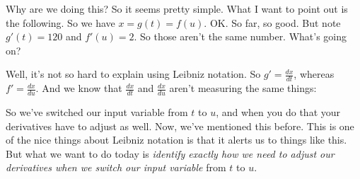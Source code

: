 \documentclass[pdftex, brazil, 12pt, twoside]{article}
\begin{document}
Why are we doing this?
So it seems pretty simple.
What I want to point out is the following.
So we have $x=g(t)=f(u)$. OK.
So far, so good.
But note $g'(t) = 120$ and $f'(u)=2$.
So those aren't the same number.
What's going on?

\begin{figure}[H]
  \begin{center}
  \end{center}
\end{figure}

Well, it's not so hard to explain using Leibniz notation.
So $\displaystyle g' = \frac{dx}{dt}$, whereas
$\displaystyle f' = \frac{dx}{du}$.
And we know that $\displaystyle \frac{dx}{dt}$ and
$\displaystyle \frac{dx}{du}$ aren't
measuring the same things:

\begin{figure}[H]
  \begin{center}
  \end{center}
\end{figure}

So we've switched our input variable from $t$ to $u$,
and when you do that your derivatives have
to adjust as well.
Now, we've mentioned this before.
This is one of the nice things about Leibniz notation
is that it alerts us to things like this.
But what we want to do today is \emph{identify exactly how we need
to adjust our derivatives when we switch our input
variable} from $t$ to $u$.
\end{document}
